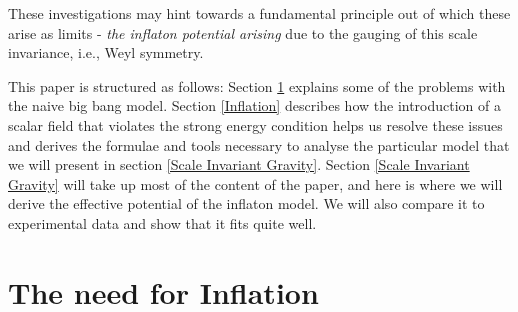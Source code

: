 \documentclass[aps,prd,reprint,preprintnumbers,showpacs,floatfix,nofootinbib,superscript address]{revtex4-2}
\begin{document}
These investigations may hint towards a fundamental principle out of which these arise as limits - \textit{the inflaton potential arising} due to the gauging of this scale invariance, i.e., Weyl symmetry.

This paper is structured as follows: Section \ref{The need for Inflation} explains some of the problems with the naive big bang model. Section \ref{Inflation} describes how the introduction of a scalar field that violates the strong energy condition helps us resolve these issues and derives the formulae and tools necessary to analyse the particular model that we will present in section \ref{Scale Invariant Gravity}. Section \ref{Scale Invariant Gravity} will take up most of the content of the paper, and here is where we will derive the effective potential of the inflaton model. We will also compare it to experimental data and show that it fits quite well.


\section{The need for Inflation}\label{The need for Inflation}
\end{document}
